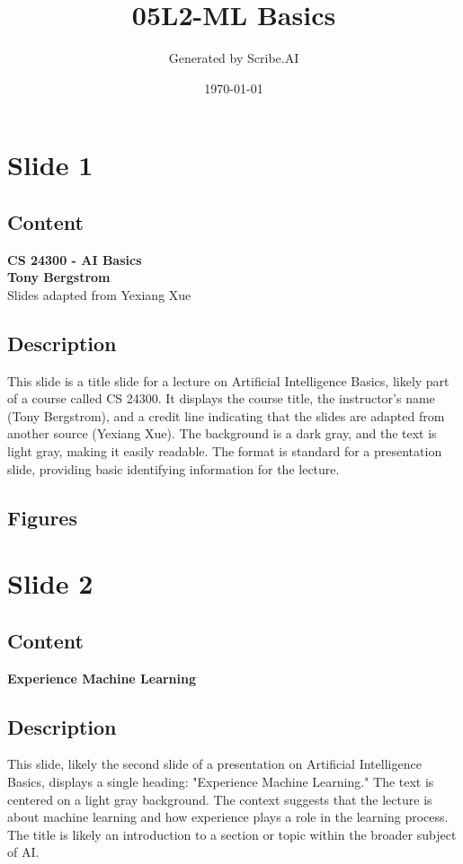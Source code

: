 \documentclass{article}%
\title{05L2{-}ML Basics}%
\author{Generated by Scribe.AI}%
\date{\today}%
\begin{document}
%
\normalsize%
\maketitle%
\section{Slide 1}%
\label{sec:Slide1}%
\subsection{Content}%

\textbf{CS 24300 - AI Basics} \\
\textbf{Tony Bergstrom} \\
Slides adapted from Yexiang Xue
%
\subsection{Description}%
This slide is a title slide for a lecture on Artificial Intelligence Basics, likely part of a course called CS 24300.  It displays the course title, the instructor's name (Tony Bergstrom), and a credit line indicating that the slides are adapted from another source (Yexiang Xue).  The background is a dark gray, and the text is light gray, making it easily readable.  The format is standard for a presentation slide, providing basic identifying information for the lecture.%
\subsection{Figures}%
\begin{figure}[H]%
\centering%
\end{figure}

%
\newpage%
\section{Slide 2}%
\label{sec:Slide2}%
\subsection{Content}%

\textbf{Experience Machine Learning}
%
\subsection{Description}%
This slide, likely the second slide of a presentation on Artificial Intelligence Basics, displays a single heading: "Experience Machine Learning."  The text is centered on a light gray background.  The context suggests that the lecture is about machine learning and how experience plays a role in the learning process.  The title is likely an introduction to a section or topic within the broader subject of AI.%
\end{document}
